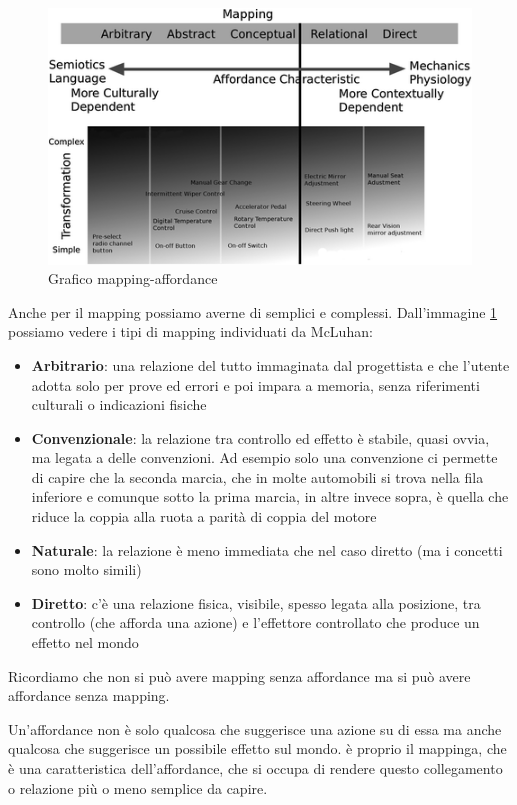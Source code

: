 \documentclass[11pt,a4paper]{book}
\begin{document}
\begin{figure}[h!]
	\begin{center}
		\includegraphics[scale=0.6]{img/007.png}
		\caption{Grafico mapping-affordance}
		\label{fig: 007}
	\end{center}
\end{figure}
Anche per il mapping possiamo averne di semplici e complessi. Dall'immagine \ref{fig: 007} possiamo vedere i tipi di mapping individuati da McLuhan:
\begin{itemize}
	\item \textbf{Arbitrario}: una relazione del tutto immaginata dal progettista e che l'utente adotta solo per prove ed errori e poi impara a memoria, senza riferimenti culturali o indicazioni fisiche
	\item \textbf{Convenzionale}: la relazione tra controllo ed effetto è stabile, quasi ovvia, ma legata a delle convenzioni. Ad esempio solo una convenzione ci permette di capire che la seconda marcia, che in molte automobili si trova nella fila inferiore e comunque sotto la prima marcia, in altre invece sopra, è quella che riduce la coppia alla ruota a parità di coppia del motore
	\item \textbf{Naturale}: la relazione è meno immediata che nel caso diretto (ma i concetti sono molto simili)
	\item \textbf{Diretto}: c'è una relazione fisica, visibile, spesso legata alla posizione, tra controllo (che afforda una azione) e l'effettore controllato che produce un effetto nel mondo
\end{itemize}

Ricordiamo che non si può avere mapping senza affordance ma si può avere affordance senza mapping.

Un'affordance non è solo qualcosa che suggerisce una azione su di essa ma anche qualcosa che suggerisce un possibile effetto sul mondo. è proprio il mappinga, che è una caratteristica dell'affordance, che si occupa di rendere questo collegamento o relazione più o meno semplice da capire.
\end{document}
